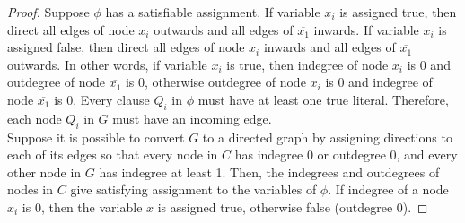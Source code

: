 \documentclass[11pt]{article}
\begin{document}
\begin{proof}
Suppose $\phi$ has a satisfiable assignment. If variable $x_i$ is assigned true, then direct all edges of node $x_i$ outwards and all edges of $\overline{x_1}$ inwards. If variable $x_i$ is assigned false, then direct all edges of node $x_i$ inwards and all edges of $\overline{x_1}$ outwards. In other words, if variable $x_i$ is true, then indegree of node $x_i$ is 0 and outdegree of node $\overline{x_1}$ is 0, otherwise outdegree of node $x_i$ is 0 and indegree of node $\overline{x_1}$ is 0. Every clause $Q_i$ in $\phi$ must have at least one true literal. Therefore, each node $Q_i$ in $G$ must have an incoming edge. \\

Suppose it is possible to convert $G$ to a directed graph by assigning directions to each of its edges so that every node in $C$ has indegree 0 or outdegree 0, and every other node in $G$ has indegree at least 1. Then, the indegrees and outdegrees of nodes in $C$ give satisfying assignment to the variables of $\phi$. If indegree of a node $x_i$ is 0, then the variable $x$ is assigned true, otherwise false (outdegree 0). 

\end{proof}
\end{document}
